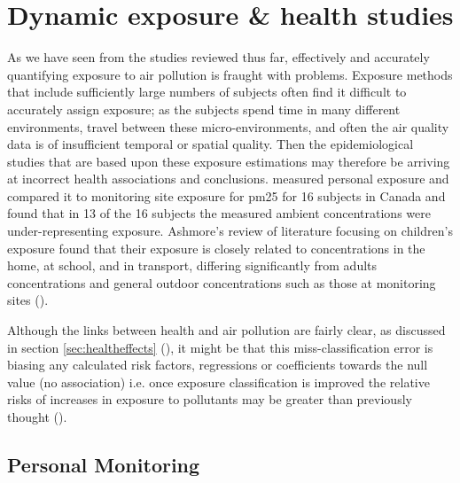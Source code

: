 \newpage
\section{Dynamic exposure \& health studies}
\label{sec:dynamicexposurehealth}

As we have seen from the studies reviewed thus far, effectively and accurately quantifying exposure to air pollution is fraught with problems. Exposure methods that include sufficiently large numbers of subjects often find it difficult to accurately assign exposure; as the subjects spend time in many different environments, travel between these micro-environments, and often the air quality data is of insufficient temporal or spatial quality. Then the epidemiological studies that are based upon these exposure estimations may therefore be arriving at incorrect health associations and conclusions. \cite{Brauer2002} measured personal exposure and compared it to monitoring site exposure for \gls{pm25} for 16 subjects in Canada and found that in 13 of the 16 subjects the measured ambient concentrations were under-representing exposure. Ashmore's review of literature focusing on children's exposure found that their exposure is closely related to concentrations in the home, at school, and in transport, differing significantly from adults concentrations and general outdoor concentrations such as those at monitoring sites (\cite{Ashmore2009}).

Although the links between health and air pollution are fairly clear, as discussed in section \ref{sec:healtheffects} (), it might be that this miss-classification error is biasing any calculated risk factors, regressions or coefficients towards the null value (no association) i.e. once exposure classification is improved the relative risks of increases in exposure to pollutants may be greater than previously thought (\cite{Armstrong1990}).


\subsection{Personal Monitoring}
\label{sec:personal_monitoring}

